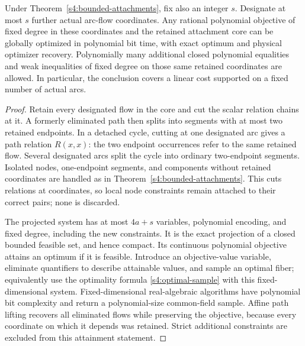 \begin{theorem}
\label{s4:fixed-support}
Under Theorem~\ref{s4:bounded-attachments}, fix also an integer $s$.
Designate at most $s$ further actual arc-flow coordinates. Any rational
polynomial objective of fixed degree in these coordinates and the
retained attachment core can be globally optimized in polynomial bit
time, with exact optimum and physical optimizer recovery. Polynomially
many additional closed polynomial equalities and weak inequalities
of fixed degree on those same retained coordinates are allowed.
In particular, the conclusion covers a linear cost supported on a
fixed number of actual arcs.
\end{theorem}
\begin{proof}
Retain every designated flow in the core and cut the scalar relation
chains at it. A formerly eliminated path then splits into segments
with at most two retained endpoints. In a detached cycle, cutting at
one designated arc gives a path relation $R(x,x)$: the two endpoint
occurrences refer to the same retained flow. Several designated arcs
split the cycle into ordinary two-endpoint segments. Isolated nodes,
one-endpoint segments, and components without retained coordinates
are handled as in Theorem~\ref{s4:bounded-attachments}. This cuts
relations at coordinates, so local node constraints remain attached
to their correct pairs; none is discarded.

The projected system has at most $4a+s$ variables, polynomial
encoding, and fixed degree, including the new constraints. It is the
exact projection of a closed bounded feasible set, and hence compact.
Its continuous polynomial objective attains an optimum if it is
feasible. Introduce an objective-value variable, eliminate quantifiers
to describe attainable values, and sample an optimal fiber; equivalently
use the optimality formula \eqref{s4:optimal-sample} with this
fixed-dimensional system. Fixed-dimensional real-algebraic algorithms
have polynomial bit complexity and return a polynomial-size common-field
sample. Affine path lifting recovers all eliminated flows while
preserving the objective, because every coordinate on which it
depends was retained. Strict additional constraints are excluded from
this attainment statement.
\end{proof}

